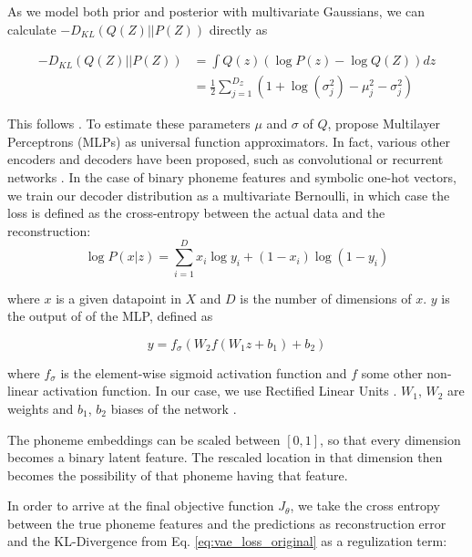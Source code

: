 \documentclass[6pt]{article}
\begin{document}
As we model both prior and posterior with multivariate Gaussians, we can calculate $-D_{KL}(Q(Z)||P(Z))$ directly as

\begin{equation}
\begin{split}
-D_{KL}(Q(Z)||P(Z)) & = \int Q(z) (\log P(z) - \log Q(Z)) dz\\
& = \frac{1}{2}\sum_{j=1}^{D_{\mathcal{Z}}}(1+\log(\sigma_j^2)-\mu_j^2-\sigma_j^2)
\end{split}
\end{equation}

This follows \cite[p. 10-11]{kingma2013auto}.
To estimate these parameters $\mu$ and $\sigma$ of $Q$,  \cite{kingma2013auto} propose Multilayer Perceptrons (MLPs) as universal function approximators. In fact, various other encoders and decoders have been proposed, such as convolutional or recurrent networks \citep{kulkarni2015deep,bowman2015generating,fabius2014variational}. 
In the case of binary phoneme features and symbolic one-hot vectors, we train our decoder distribution as a multivariate Bernoulli, in which case the loss is defined as the cross-entropy between the actual data and the reconstruction:
\begin{equation}
\log P(x|z) = \sum_{i=1}^{D} x_i \log y_i + (1-x_i) \log (1-y_i)
\label{eq:multivariate_bernoulli_prob}
\end{equation}

\noindent where $x$ is a given datapoint in $X$ and $D$ is the number of dimensions of $x$. $y$ is the output of of the MLP, defined as 

\begin{equation}
y = f_\sigma (W_2 f(W_1 z + b_1 ) + b_2)
\end{equation}

\noindent where $f_\sigma$ is the element-wise sigmoid activation function and $f$ some other non-linear activation function. In our case, we use Rectified Linear Units \citep{nair2010rectified}. $W_1$, $W_2$ are weights and $b_1$, $b_2$ biases of the network \citep[p. 11]{kingma2013auto}.

The phoneme embeddings  can be scaled between $[0,1]$, so that every dimension becomes a binary latent feature. The rescaled location in that dimension then becomes the possibility of that phoneme having that feature. 

In order to arrive at the final objective function $J_\theta$, we take the cross entropy between the true phoneme features and the predictions as reconstruction error and the KL-Divergence from Eq. \ref{eq:vae_loss_original} as a regulization term:
\end{document}
